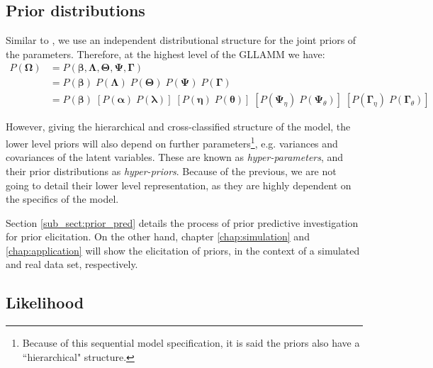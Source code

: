 
\subsection{Prior distributions} \label{sub_sect:priors}

Similar to \citet{Patz_et_al_1999}, we use an independent distributional structure for the joint priors of the parameters. Therefore, at the highest level of the GLLAMM we have:
%
\begin{equation} \label{eq:priors}
	\begin{split}
		P( \pmb{\Omega} ) & = P( \pmb{\beta}, \pmb{\Lambda}, \pmb{\Theta}, \pmb{\Psi}, \pmb{\Gamma} ) \\
		&= P( \pmb{\beta} ) \; P( \pmb{\Lambda} ) \; P( \pmb{\Theta} ) \; P( \pmb{\Psi} ) \; P( \pmb{\Gamma} ) \\
		&= P( \pmb{\beta} ) \; \left[ P( \pmb{\alpha} ) \; P( \pmb{\lambda} ) \right] \; \left[ P( \pmb{\eta} ) \; P( \pmb{\theta} ) \right] \; \left[ P( \pmb{\Psi}_{\eta} ) \; P( \pmb{\Psi}_{\theta} ) \right] \; \left[ P( \pmb{\Gamma}_{\eta} ) \; P( \pmb{\Gamma}_{\theta} ) \right]
	\end{split}
\end{equation}

However, giving the hierarchical and cross-classified structure of the model, the lower level priors will also depend on further parameters\footnote{Because of this sequential model specification, it is said the priors also have a ``hierarchical" structure.}, e.g. variances and covariances of the latent variables. These are known as \textit{hyper-parameters}, and their prior distributions as \textit{hyper-priors}. Because of the previous, we are not going to detail their lower level representation, as they are highly dependent on the specifics of the model.

Section \ref{sub_sect:prior_pred} details the process of prior predictive investigation for prior elicitation. On the other hand, chapter \ref{chap:simulation} and \ref{chap:application} will show the elicitation of priors, in the context of a simulated and real data set, respectively.


\subsection{Likelihood}


